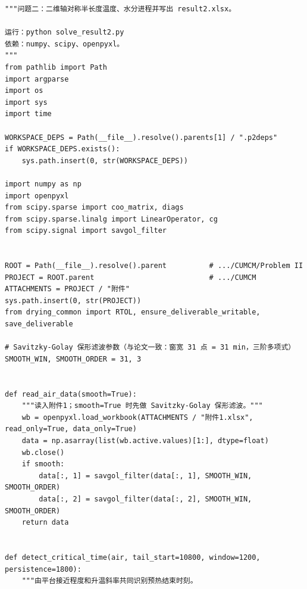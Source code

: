 \documentclass[12pt,a4paper]{ctexart}
\begin{document}
\begin{lstlisting}[caption={solve\_result2.py }]
"""问题二：二维轴对称半长度温度、水分进程并写出 result2.xlsx。

运行：python solve_result2.py
依赖：numpy、scipy、openpyxl。
"""
from pathlib import Path
import argparse
import os
import sys
import time

WORKSPACE_DEPS = Path(__file__).resolve().parents[1] / ".p2deps"
if WORKSPACE_DEPS.exists():
    sys.path.insert(0, str(WORKSPACE_DEPS))

import numpy as np
import openpyxl
from scipy.sparse import coo_matrix, diags
from scipy.sparse.linalg import LinearOperator, cg
from scipy.signal import savgol_filter


ROOT = Path(__file__).resolve().parent          # .../CUMCM/Problem II
PROJECT = ROOT.parent                           # .../CUMCM
ATTACHMENTS = PROJECT / "附件"
sys.path.insert(0, str(PROJECT))
from drying_common import RTOL, ensure_deliverable_writable, save_deliverable

# Savitzky-Golay 保形滤波参数（与论文一致：窗宽 31 点 = 31 min，三阶多项式）
SMOOTH_WIN, SMOOTH_ORDER = 31, 3


def read_air_data(smooth=True):
    """读入附件1；smooth=True 时先做 Savitzky-Golay 保形滤波。"""
    wb = openpyxl.load_workbook(ATTACHMENTS / "附件1.xlsx", read_only=True, data_only=True)
    data = np.asarray(list(wb.active.values)[1:], dtype=float)
    wb.close()
    if smooth:
        data[:, 1] = savgol_filter(data[:, 1], SMOOTH_WIN, SMOOTH_ORDER)
        data[:, 2] = savgol_filter(data[:, 2], SMOOTH_WIN, SMOOTH_ORDER)
    return data


def detect_critical_time(air, tail_start=10800, window=1200, persistence=1800):
    """由平台接近程度和升温斜率共同识别预热结束时刻。


\end{lstlisting}
\end{document}

